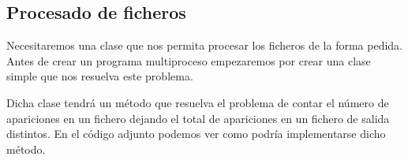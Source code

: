 \documentclass[letterpaper,10pt,spanish]{sphinxmanual}
\begin{document}
\subsection{Procesado de ficheros}
\label{\detokenize{textos/tema1:procesado-de-ficheros}}
Necesitaremos una clase  que nos permita procesar los ficheros de la forma pedida. Antes de crear un programa multiproceso empezaremos por crear una clase simple que nos resuelva este problema.

Dicha clase tendrá un método  que resuelva el problema de contar el número de apariciones en un fichero dejando el total de apariciones en un fichero de salida distintos. En el código adjunto podemos ver como podría implementarse dicho método.

\begin{sphinxVerbatim}[commandchars=\\\{\}]
   
        
        
       
       
        
          
     
\end{sphinxVerbatim}
\end{document}
